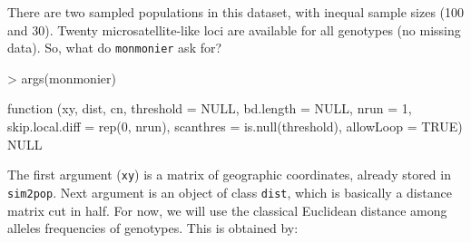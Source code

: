 \documentclass{article}
\begin{document}
There are two sampled populations in this dataset, with inequal sample sizes (100 and 30).
Twenty microsatellite-like loci are available for all genotypes (no missing data).
So, what do \texttt{monmonier} ask for?
\begin{Schunk}
\begin{Sinput}
> args(monmonier)
\end{Sinput}
\begin{Soutput}
function (xy, dist, cn, threshold = NULL, bd.length = NULL, nrun = 1, 
    skip.local.diff = rep(0, nrun), scanthres = is.null(threshold), 
    allowLoop = TRUE) 
NULL
\end{Soutput}
\end{Schunk}

\noindent The first argument (\texttt{xy}) is a matrix of geographic coordinates, already stored in \texttt{sim2pop}.
Next argument is an object of class \texttt{dist}, which is basically a distance matrix cut in half.
For now, we will use the classical Euclidean distance among alleles frequencies of genotypes.
This is obtained by:
\begin{Schunk}
\end{Schunk}
\end{document}
